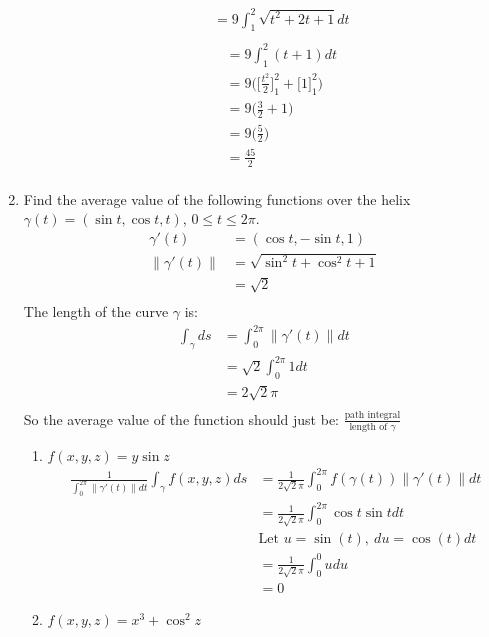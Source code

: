 \documentclass{article}
\newcommand{\norm}[1]{\| #1 \|}
\begin{document}
\begin{enumerate}
\begin{enumerate}
\begin{multicols}{2}
\begin{align*}
        &= 9 \int_1^2 \sqrt{t^2 + 2t +  1} dt \\
    \end{align*}
    \begin{align*} 
        &= 9 \int_1^2 (t + 1) dt \\ 
        &= 9 \Big( \Big[ \frac{t^2}{2} \Big]_1^2 + \Big[1\Big]_1^2 \Big) \\
        &= 9 \Big( \frac{3}{2} + 1 \Big) \\
        &= 9 \Big( \frac{5}{2} \Big) \\
        &= \frac{45}{2} \\
    \end{align*}
    \end{multicols}
\end{enumerate}
\newpage
\item Find the average value of the following functions over the helix $\gamma(t) = (\sin t, \cos t, t)$, $0\leq t \leq 2\pi$.
\begin{align*}
    \gamma'(t) &= ( \cos t, - \sin t, 1) \\
    \norm{\gamma'(t)} &= \sqrt{ \sin^2t + \cos^2t +1} \\ 
    &= \sqrt{2} \\
\end{align*}
The length of the curve $\gamma$ is:
\begin{align*}
    \int_\gamma ds &= \int_0^{2\pi} \norm{\gamma'(t)} dt \\
    &= \sqrt{2} \int_0^{2\pi} 1 dt \\
    &= 2\sqrt{2}\pi \\
\end{align*}
So the average value of the function should just be: $\displaystyle \frac{\text{path integral}}{\text{length of }\gamma}$
\begin{enumerate}
    \item $f(x,y,z) = y\sin z$
    \begin{align*} 
        \frac{1}{\int_0^{2\pi} \norm{\gamma'(t)}dt}  \int_{\gamma}f(x,y,z)ds &= \frac{1}{2\sqrt{2}\pi} \int_0^{2\pi} f(\gamma(t)) \norm{\gamma'(t)}dt \\
        &= \frac{1}{2\sqrt{2}\pi} \int_0^{2\pi} \cos t \sin t dt \\
        &\text{Let } u = \sin(t),\: du = \cos(t)dt \\
        &= \frac{1}{2\sqrt{2}\pi} \int_0^0 udu \\
        &= 0
    \end{align*}
    \item $f(x,y,z) = x^3 + \cos^2 z$

\end{enumerate}
\end{enumerate}
\end{document}
